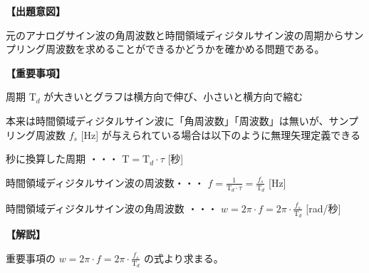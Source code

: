 \noindent \textbf{【出題意図】}

\bigskip
\noindent 元のアナログサイン波の角周波数と時間領域ディジタルサイン波の周期からサンプリング周波数を求めることができるかどうかを確かめる問題である。

\vspace{1em}
\noindent \textbf{【重要事項】}

\bigskip
\noindent 周期 $\textrm{T}_d$ が大きいとグラフは横方向で伸び、小さいと横方向で縮む

\bigskip
\noindent 本来は時間領域ディジタルサイン波に「角周波数」「周波数」は無いが、サンプリング周波数 $f_s$ [Hz] が与えられている場合は以下のように無理矢理定義できる

\bigskip
\noindent 秒に換算した周期 ・・・ $\textrm{T} = \textrm{T}_d \cdot \tau$ [秒]

\bigskip
\noindent 時間領域ディジタルサイン波の周波数・・・ $f = \frac{1}{\textrm{T}_d\cdot\tau} = \frac{f_s}{\textrm{T}_d}$ [Hz]

\bigskip
\noindent 時間領域ディジタルサイン波の角周波数 ・・・ $w = 2\pi \cdot f = 2 \pi \cdot \frac{f_s}{\textrm{T}_d}$ [rad/秒]

\bigskip

\vspace{1em}
\noindent \textbf{【解説】}

\bigskip
\noindent 重要事項の $w = 2\pi \cdot f = 2 \pi \cdot \frac{f_s}{\textrm{T}_d}$ の式より求まる。
